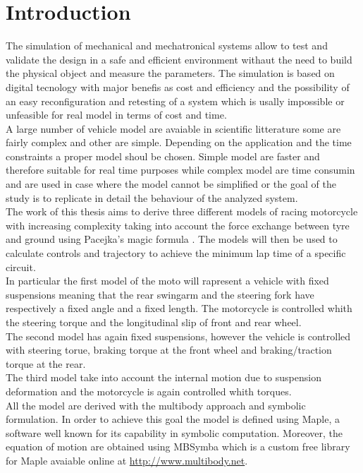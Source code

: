 \chapter*{Introduction}

The simulation of mechanical and mechatronical systems allow to test and validate the design in a safe and efficient environment withaut the need to build the physical object and measure the parameters. The simulation is based on digital tecnology with major benefis as cost and efficiency and the possibility of an easy reconfiguration and retesting of a system which is usally impossible or unfeasible for real model in terms of cost and time.\cite{maria1997introduction}\\
A large number of vehicle model are avaiable in scientific litterature some are fairly complex and other are simple. Depending on the application and the time constraints a proper model shoul be chosen. Simple model are faster and therefore suitable for real time purposes while complex model are time consumin and are used in case where the model cannot be simplified or the goal of the study is to replicate in detail the behaviour of the analyzed system.\\
The work of this thesis aims to derive three different models of racing motorcycle with increasing complexity taking into account the force exchange between tyre and ground using Pacejka's magic formula \cite{pacejka2006tyre}. The models will then be used to calculate controls and trajectory to achieve the minimum lap time of a specific circuit.\\
In particular the first model of the moto will rapresent a vehicle with fixed suspensions meaning that the rear swingarm and the steering fork have respectively a fixed angle and a fixed length. The motorcycle is controlled whith the steering torque and the longitudinal slip of front and rear wheel.\\
The second model has again fixed suspensions, however the vehicle is controlled with steering torue, braking torque at the front wheel and braking/traction torque at the rear.\\  
The third model take into account the internal motion due to suspension deformation and the motorcycle is again controlled whith torques.\\
All the model are derived with the multibody approach and symbolic formulation. In order to achieve this goal the model is defined using Maple, a software well known for its capability in symbolic computation. Moreover, the equation of motion are obtained using MBSymba which is a custom free library for Maple avaiable online at \url{http://www.multibody.net}.\\
